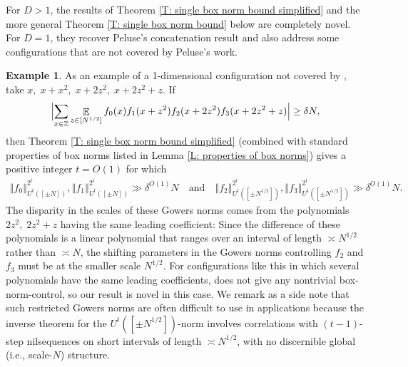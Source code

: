 \documentclass[11pt]{amsart}
\theoremstyle{definition}
\newtheorem{example}[lemma]{Example} %
\DeclareMathOperator*{\E}{\mathbb{E}}
\newcommand{\Z}{{\mathbb Z}}
\newcommand{\norm}[1]{\left\Vert #1\right\Vert}
\newcommand{\Bigabs}[1]{\Bigl| #1 \Bigr|}
\begin{document}
For $D>1$, the results of Theorem \ref{T: single box norm bound simplified} and the more general Theorem \ref{T: single box norm bound} below are completely novel.  For $D=1$, they recover Peluse's concatenation result \cite[Theorem 6.1]{Pel20} and also address some configurations that are not covered by Peluse's work.
\begin{example}\label{Ex: Peluse}
    As an example of a 1-dimensional configuration not covered by \cite[Theorem 6.1]{Pel20}, take $x,\; x + x^2,\; x+ 2z^2,\; x + 2z^2 + z$. If 
    \begin{align*}
        \Bigabs{\sum_{x\in\Z}\E_{z\in[N^{1/2}]}f_0(x)f_1(x + z^2) f_2(x + 2z^2)f_3(x + 2z^2 + z)} \geq \delta N,
    \end{align*}
    then Theorem \ref{T: single box norm bound simplified} (combined with standard properties of box norms listed in Lemma \ref{L: properties of box norms}) gives a positive integer $t=O(1)$ for which
    \begin{align*}
        \norm{f_0}_{U^t([\pm N])}^{2^t}, \norm{f_1}_{U^t([\pm N])}^{2^t}\gg \delta^{O(1)}N \quad \text{and}\quad \norm{f_2}_{U^t([\pm N^{1/2}])}^{2^t}, \norm{f_3}_{U^t([\pm N^{1/2}])}^{2^t}\gg \delta^{O(1)}N.
    \end{align*}
    The disparity in the scales of these Gowers norms comes from the polynomials $2z^2,\; 2z^2 + z$ having the same leading coefficient: Since the difference of these polynomials is a linear polynomial that ranges over an interval of length $\asymp N^{1/2}$ rather than $\asymp N$, the shifting parameters in the Gowers norms controlling $f_2$ and $f_3$ must be at the smaller scale $N^{1/2}$. For configurations like this in which several polynomials have the same leading coefficients, \cite[Theorem 6.1]{Pel20} does not give any nontrivial box-norm-control, so our result is novel in this case. We remark as a side note that such restricted Gowers norms are often difficult to use in applications because the inverse theorem for the $U^t([\pm N^{1/2}])$-norm involves correlations with $(t-1)$-step nilsequences on short intervals of length $\asymp N^{1/2}$, with no discernible global (i.e., scale-$N$) structure.
\end{example}
\end{document}
